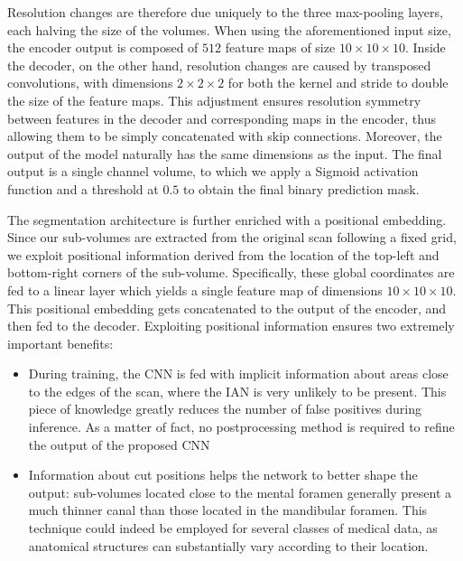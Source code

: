 Resolution changes are therefore due uniquely to the
three max-pooling layers, each halving the size of the
volumes. When using the aforementioned input size, the
encoder output is composed of $512$ feature maps of size
$10 \times 10 \times 10$. Inside the decoder, on the other hand, resolution changes are caused by transposed convolutions, with
dimensions $2 \times 2 \times 2$ for both the kernel and stride to double the size of the feature maps. This adjustment ensures
resolution symmetry between features in the decoder and
corresponding maps in the encoder, thus allowing them to
be simply concatenated with skip connections. Moreover,
the output of the model naturally has the same dimensions
as the input. The final output is a single channel volume, to
which we apply a Sigmoid activation function and a threshold at $0.5$ to obtain the final binary prediction mask.

The segmentation architecture is further enriched with a
positional embedding. Since our sub-volumes are extracted
from the original scan following a fixed grid, we exploit
positional information derived from the location of the top-left and bottom-right corners of the sub-volume. Specifically, these global coordinates are fed to a linear layer which
yields a single feature map of dimensions $10 \times 10 \times 10$. This
positional embedding gets concatenated to the output of the
encoder, and then fed to the decoder. Exploiting positional
information ensures two extremely important benefits:
\begin{itemize}
  \item{During training, the CNN is fed with implicit information about areas
  close to the edges of the scan, where the IAN is very unlikely to be present.
  This piece of knowledge greatly reduces the number of false positives during
  inference. As a matter of fact, no postprocessing method is required to refine
  the output of the proposed CNN}
  \item{Information about cut positions helps the network to better shape the
  output: sub-volumes located close to the mental foramen generally present a
  much thinner canal than those located in the mandibular foramen. This
  technique could indeed be employed for several classes of medical data, as
  anatomical structures can substantially vary according to their location.}
\end{itemize}

